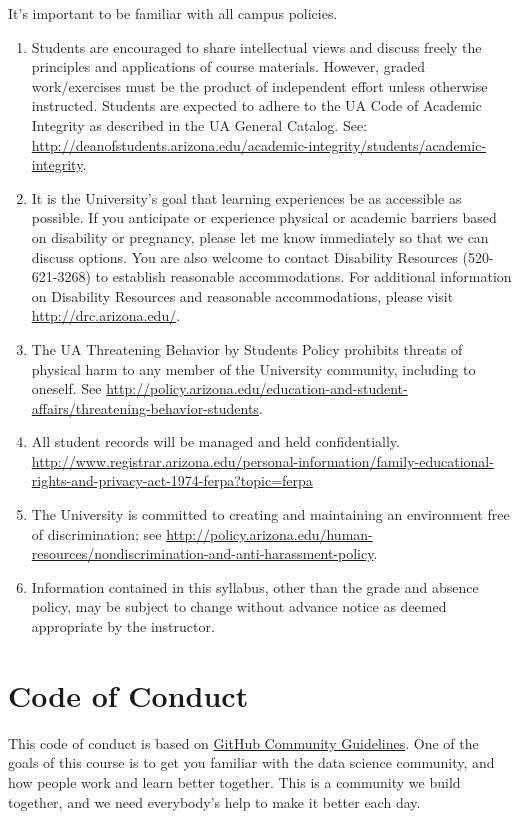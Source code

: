 \documentclass[
]{book}
\begin{document}
It's important to be familiar with all campus policies.

\begin{enumerate}
\def\labelenumi{\arabic{enumi}.}
\item
  Students are encouraged to share intellectual views and discuss freely the principles and applications of course materials. However, graded work/exercises must be the product of independent effort unless otherwise instructed. Students are expected to adhere to the UA Code of Academic Integrity as described in the UA General Catalog. See: \url{http://deanofstudents.arizona.edu/academic-integrity/students/academic-integrity}.
\item
  It is the University's goal that learning experiences be as accessible as possible. If you anticipate or experience physical or academic barriers based on disability or pregnancy, please let me know immediately so that we can discuss options. You are also welcome to contact Disability Resources (520-621-3268) to establish reasonable accommodations. For additional information on Disability Resources and reasonable accommodations, please visit \url{http://drc.arizona.edu/}.
\item
  The UA Threatening Behavior by Students Policy prohibits threats of physical harm to any member of the University community, including to oneself. See \url{http://policy.arizona.edu/education-and-student-affairs/threatening-behavior-students}.
\item
  All student records will be managed and held confidentially. \url{http://www.registrar.arizona.edu/personal-information/family-educational-rights-and-privacy-act-1974-ferpa?topic=ferpa}
\item
  The University is committed to creating and maintaining an environment free of discrimination; see \url{http://policy.arizona.edu/human-resources/nondiscrimination-and-anti-harassment-policy}.
\item
  Information contained in this syllabus, other than the grade and absence policy, may be subject to change without advance notice as deemed appropriate by the instructor.
\end{enumerate}

\hypertarget{code-of-conduct}{%
\section{Code of Conduct}\label{code-of-conduct}}

This code of conduct is based on \href{https://docs.github.com/en/github/site-policy/github-community-guidelines}{GitHub Community Guidelines}. One of the goals of this course is to get you familiar with the data science community, and how people work and learn better together. This is a community we build together, and we need everybody's help to make it better each day.
\end{document}
